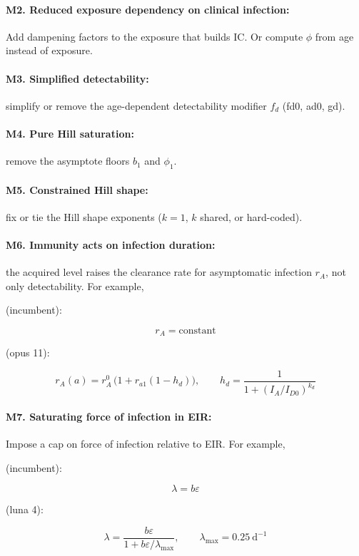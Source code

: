 \documentclass[11pt]{article}
\begin{document}
\paragraph{M2. Reduced exposure dependency on clinical infection:} Add dampening factors to the exposure that builds IC. Or compute $\phi$ from age instead of exposure.

\paragraph{M3. Simplified detectability:} simplify or remove the age-dependent detectability modifier $f_d$ (fd0, ad0, gd).

\paragraph{M4. Pure Hill saturation:} remove the asymptote floors $b_1$ and $\phi_1$.

\paragraph{M5. Constrained Hill shape:} fix or tie the Hill shape exponents ($k=1$, $k$ shared, or hard-coded).

\paragraph{M6. Immunity acts on infection duration:} the acquired level raises the clearance rate for asymptomatic infection $r_A$, not only detectability. For example,

(incumbent):

$$r_A = \mathrm{constant}$$

(opus 11):

$$r_A(a) = r_A^{0}\,\big(1 + r_{a1}(1 - h_d)\big), \qquad h_d = \frac{1}{1+(I_A/I_{D0})^{k_d}}$$

\paragraph{M7. Saturating force of infection in EIR:} Impose a cap on force of infection relative to EIR. For example,

(incumbent):

$$\lambda = b\varepsilon$$

(luna 4):

$$\lambda = \frac{b\varepsilon}{1 + b\varepsilon/\lambda_{\max}}, \qquad \lambda_{\max} = 0.25\ \text{d}^{-1}$$
\end{document}
